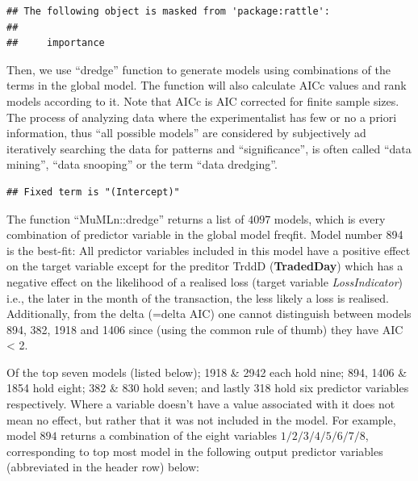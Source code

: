 \documentclass[]{article}
\begin{document}
\begin{verbatim}
## The following object is masked from 'package:rattle':
## 
##     importance
\end{verbatim}

\doublespacing

Then, we use ``dredge'' function to generate models using combinations
of the terms in the global model. The function will also calculate AICc
values and rank models according to it. Note that AICc is AIC corrected
for finite sample sizes. The process of analyzing data where the
experimentalist has few or no a priori information, thus ``all possible
models'' are considered by subjectively ad iteratively searching the
data for patterns and ``significance'', is often called ``data mining'',
``data snooping'' or the term ``data dredging''.

\singlespacing

\begin{verbatim}
## Fixed term is "(Intercept)"
\end{verbatim}

\doublespacing

The function ``MuMLn::dredge'' returns a list of \(4097\) models, which
is every combination of predictor variable in the global model freqfit.
Model number 894 is the best-fit: All predictor variables included in
this model have a positive effect on the target variable except for the
preditor TrddD (\textbf{TradedDay}) which has a negative effect on the
likelihood of a realised loss (target variable \emph{LossIndicator})
i.e., the later in the month of the transaction, the less likely a loss
is realised. Additionally, from the delta (=delta AIC) one cannot
distinguish between models 894, 382, 1918 and 1406 since (using the
common rule of thumb) they have AIC \textless{} 2.\medskip

Of the top seven models (listed below); 1918 \& 2942 each hold nine;
894, 1406 \& 1854 hold eight; 382 \& 830 hold seven; and lastly 318 hold
six predictor variables respectively. Where a variable doesn't have a
value associated with it does not mean no effect, but rather that it was
not included in the model. For example, model \(894\) returns a
combination of the eight variables \(1/2/3/4/5/6/7/8\), corresponding to
top most model in the following output predictor variables (abbreviated
in the header row) below:
\end{document}
